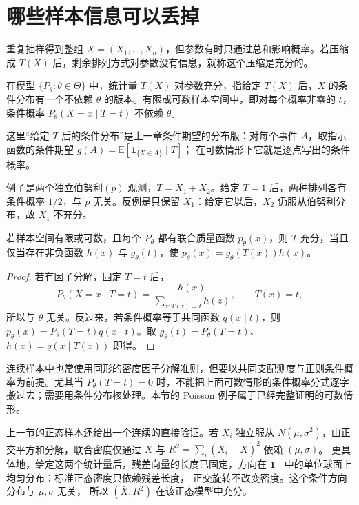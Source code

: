 \section{哪些样本信息可以丢掉}

重复抽样得到整组 \(X=(X_1,\ldots,X_n)\)，但参数有时只通过总和影响概率。若压缩成 \(T(X)\) 后，剩余排列方式对参数没有信息，就称这个压缩是充分的。

\begin{definition}[充分统计量]
在模型 \(\{P_\theta:\theta\in\Theta\}\) 中，统计量 \(T(X)\) 对参数充分，指给定 \(T(X)\) 后，\(X\) 的条件分布有一个不依赖 \(\theta\) 的版本。有限或可数样本空间中，即对每个概率非零的 \(t\)，条件概率 \(P_\theta(X=x\mid T=t)\) 不依赖 \(\theta\)。
\end{definition}

这里“给定 \(T\) 后的条件分布”是上一章条件期望的分布版：对每个事件 \(A\)，取指示函数的条件期望
\(g(A)=\mathbb E[\mathbf1_{\{X\in A\}}\mid T]\)；
在可数情形下它就是逐点写出的条件概率。

例子是两个独立伯努利\((p)\) 观测，\(T=X_1+X_2\)。给定 \(T=1\) 后，两种排列各有条件概率 \(1/2\)，与 \(p\) 无关。反例是只保留 \(X_1\)：给定它以后，\(X_2\) 仍服从伯努利分布，故 \(X_1\) 不充分。

\begin{theorem}[因子分解准则]
若样本空间有限或可数，且每个 \(P_\theta\) 都有联合质量函数
\(p_\theta(x)\)，则 \(T\) 充分，当且仅当存在非负函数 \(h(x)\) 与
\(g_\theta(t)\)，使 \(p_\theta(x)=g_\theta(T(x))h(x)\)。
\end{theorem}
\begin{proof}
若有因子分解，固定 \(T=t\) 后，
\[
P_\theta(X=x\mid T=t)
=\frac{h(x)}{\sum_{z:T(z)=t}h(z)},\qquad T(x)=t,
\]
所以与 \(\theta\) 无关。反过来，若条件概率等于共同函数 \(q(x\mid t)\)，则
\(p_\theta(x)=P_\theta(T=t)q(x\mid t)\)。取
\(g_\theta(t)=P_\theta(T=t)\)、\(h(x)=q(x\mid T(x))\) 即得。

\end{proof}

连续样本中也常使用同形的密度因子分解准则，但要以共同支配测度与正则条件概率为前提。尤其当 \(P_\theta(T=t)=0\) 时，不能把上面可数情形的条件概率分式逐字搬过去；需要用条件分布核处理。本节的 Poisson 例子属于已经完整证明的可数情形。

上一节的正态样本还给出一个连续的直接验证。若 \(X_i\) 独立服从
\(N(\mu,\sigma^2)\)，由正交平方和分解，联合密度仅通过
\(\bar X\) 与 \(R^2=\sum_i(X_i-\bar X)^2\) 依赖 \((\mu,\sigma)\)。
更具体地，给定这两个统计量后，残差向量的长度已固定，方向在
\(\mathbf1^\perp\) 中的单位球面上均匀分布：标准正态密度只依赖残差长度，
正交旋转不改变密度。这个条件方向分布与 \(\mu,\sigma\) 无关，
所以 \((\bar X,R^2)\) 在该正态模型中充分。

